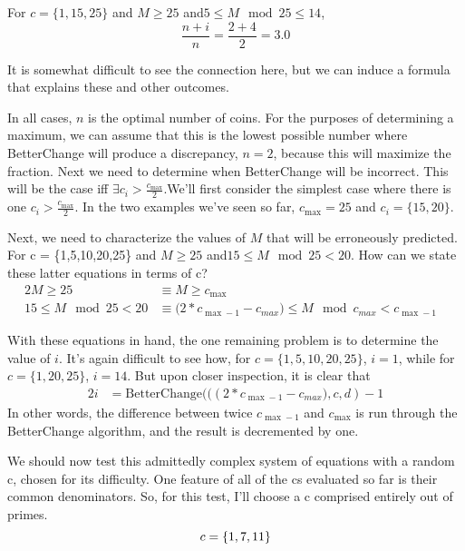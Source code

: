 \documentclass[12pt]{amsart}
\begin{document}
For $c=\{1,15,25\}$ and $M \geq 25$ and$5 \leq M\mod 25 \leq 14$, 
\begin{displaymath}
\frac{n+i}{n}=\frac{2+4}{2}=3.0
\end{displaymath}

It is somewhat difficult to see the connection here, but we can induce a formula that explains these and other outcomes.

In all cases, $n$ is the optimal number of coins.  For the purposes of determining a maximum, we can assume that this is the lowest possible number where BetterChange will produce a discrepancy, $n=2$, because this will maximize the fraction.  Next we need to determine when BetterChange will be incorrect.  This will be the case iff $\exists c_i > \frac{c_{\max}}{2}$.We'll first consider the simplest case where there is one $c_i > \frac{c_{\max}}{2}$.  In the two examples we've seen so far, $c_{\max}=25$ and $c_i = \{15,20\}$.

Next, we need to characterize the values of $M$ that will be erroneously predicted.  For
c = \{1,5,10,20,25\} and $M \geq 25$ and$15 \leq M\mod 25 < 20$.  How can we state these latter equations in terms of c?
\begin{alignat*}{2}
M \geq 25 &\equiv M\geq c_{\max}&\\
15 \leq M\mod 25 < 20&\equiv \big(2*c_{\max-1} -c_{max}\big) \leq M \mod c_{max} < c_{\max-1}
\end{alignat*}

With these equations in hand, the one remaining problem is to determine the value of $i$.  It's again difficult to see how, for $c=\{1,5,10,20,25\}$, $i=1$, while for $c=\{1,20,25\}$, $i=14$.  But upon closer inspection, it is clear that 
\begin{alignat*}{2}
i&=\text{BetterChange}\Big(((2*c_{\max-1} -c_{max}\big), c, d)-1
\end{alignat*}
In other words, the difference between twice $c_{\max-1}$ and $c_{\max}$ is run through the BetterChange algorithm, and the result is decremented by one.

We should now test this admittedly complex system of equations with a random c, chosen for its difficulty.  One feature of all of the cs evaluated so far is their common denominators.  So, for this test, I'll choose a c comprised entirely out of primes.
\begin{displaymath}
c=\{1,7,11\}\\
\end{displaymath}
\end{document}
